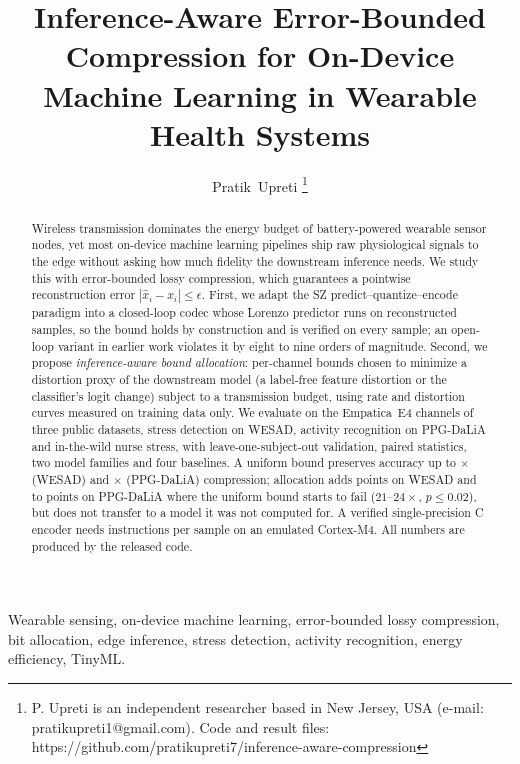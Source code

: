 \documentclass[journal]{IEEEtran}
\begin{document}
\title{Inference-Aware Error-Bounded Compression for On-Device Machine Learning in Wearable Health Systems}
\author{Pratik~Upreti%
\thanks{P. Upreti is an independent researcher based in New Jersey, USA (e-mail: pratikupreti1@gmail.com). Code and result files: https://github.com/pratikupreti7/inference-aware-compression}}
\maketitle

\begin{abstract}
Wireless transmission dominates the energy budget of battery-powered wearable sensor nodes, yet most on-device machine learning pipelines ship raw physiological signals to the edge without asking how much fidelity the downstream inference needs. We study this with error-bounded lossy compression, which guarantees a pointwise reconstruction error $|\hat{x}_i-x_i|\le\epsilon$. First, we adapt the SZ predict--quantize--encode paradigm into a closed-loop codec whose Lorenzo predictor runs on reconstructed samples, so the bound holds by construction and is verified on every sample; an open-loop variant in earlier work violates it by eight to nine orders of magnitude. Second, we propose \emph{inference-aware bound allocation}: per-channel bounds chosen to minimize a distortion proxy of the downstream model (a label-free feature distortion or the classifier's logit change) subject to a transmission budget, using rate and distortion curves measured on training data only. We evaluate on the Empatica~E4 channels of three public datasets, stress detection on WESAD, activity recognition on PPG-DaLiA and in-the-wild nurse stress, with leave-one-subject-out validation, paired statistics, two model families and four baselines. A uniform bound preserves accuracy up to \ratioEe$\times$ (WESAD) and \daliaRatioEe$\times$ (PPG-DaLiA) compression; allocation adds \allocClfDiffBA{} points on WESAD and \daliaallocClfDiffBA{} to \daliaallocClfDiffBD{} points on PPG-DaLiA where the uniform bound starts to fail ($21$--$24\times$, $p\le0.02$), but does not transfer to a model it was not computed for. A verified single-precision C encoder needs \fwInstrPerSample{} instructions per sample on an emulated Cortex-M4. All numbers are produced by the released code.
\end{abstract}

\begin{IEEEkeywords}
Wearable sensing, on-device machine learning, error-bounded lossy compression, bit allocation, edge inference, stress detection, activity recognition, energy efficiency, TinyML.
\end{IEEEkeywords}
\end{document}
